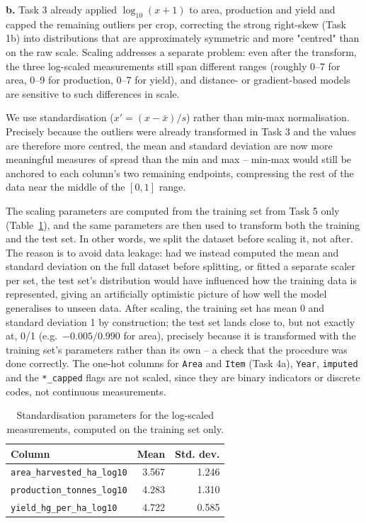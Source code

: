 \textbf{b.}
Task 3 already applied $\log_{10}(x+1)$ to area, production and yield and capped the remaining outliers per crop, correcting the strong right-skew (Task 1b) into distributions that are approximately symmetric and more "centred" than on the raw scale. Scaling addresses a separate problem: even after the transform, the three log-scaled measurements still span different ranges (roughly 0--7 for area, 0--9 for production, 0--7 for yield), and distance- or gradient-based models are sensitive to such differences in scale.

We use standardisation ($x' = (x-\bar{x})/s$) rather than min-max normalisation. Precisely because the outliers were already transformed in Task 3 and the values are therefore more centred, the mean and standard deviation are now more meaningful measures of spread than the min and max -- min-max would still be anchored to each column's two remaining endpoints, compressing the rest of the data near the middle of the $[0,1]$ range.

The scaling parameters are computed from the training set from Task 5 only (Table~\ref{tab:scaling}), and the same parameters are then used to transform both the training and the test set. In other words, we split the dataset before scaling it, not after. The reason is to avoid data leakage: had we instead computed the mean and standard deviation on the full dataset before splitting, or fitted a separate scaler per set, the test set's distribution would have influenced how the training data is represented, giving an artificially optimistic picture of how well the model generalises to unseen data. After scaling, the training set has mean 0 and standard deviation 1 by construction; the test set lands close to, but not exactly at, 0/1 (e.g.\ $-0.005/0.990$ for area), precisely because it is transformed with the training set's parameters rather than its own -- a check that the procedure was done correctly. The one-hot columns for \texttt{Area} and \texttt{Item} (Task 4a), \texttt{Year}, \texttt{imputed} and the \texttt{*\_capped} flags are not scaled, since they are binary indicators or discrete codes, not continuous measurements.

\begin{table}[H]
    \centering
    \begin{tabular}{lrr}
        \toprule
        Column & Mean & Std. dev. \\
        \midrule
        \texttt{area\_harvested\_ha\_log10} & 3.567 & 1.246 \\
        \texttt{production\_tonnes\_log10} & 4.283 & 1.310 \\
        \texttt{yield\_hg\_per\_ha\_log10} & 4.722 & 0.585 \\
        \bottomrule
    \end{tabular}
    \caption{Standardisation parameters for the log-scaled measurements, computed on the training set only.}
    \label{tab:scaling}
\end{table}
